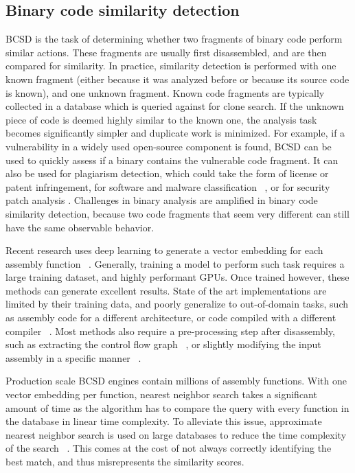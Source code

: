 \subsection{Binary code similarity detection}

BCSD is the task of determining whether two fragments of binary code perform similar actions.
These fragments are usually first disassembled, and are then compared for similarity. In practice,
similarity detection is performed with one known fragment (either because it was analyzed before
or because its source code is known), and one unknown fragment. Known code fragments are typically collected in a
database which is queried against for clone search. If the unknown piece of code is deemed
highly similar to the known one, the analysis task becomes significantly simpler and duplicate work is minimized. For example,
if a vulnerability in a widely used open-source component is found, BCSD can be used to quickly
assess if a binary contains the vulnerable code fragment. It can also be used for plagiarism detection, which
could take the form of license or patent infringement, for software and malware classification ~\cite{op-seq}, or for 
security patch analysis \cite{patch}. Challenges in binary analysis are amplified in binary code similarity detection,
because two code fragments that seem very different can still have the same observable behavior.

Recent research uses deep learning to generate a vector embedding for each assembly function ~\cite{SAFE,PalmTree,OrderMatters,Asm2Vec,CLAP}.
Generally, training a model to perform such task requires a large training dataset, and highly performant GPUs.
Once trained however, these methods can generate excellent results.
State of the art implementations are limited by their training data, and poorly generalize to out-of-domain tasks,
such as assembly code for a different architecture, or code compiled with a different compiler ~\cite{BCSDsurvey,CLAP}.
Most methods also require a pre-processing step after disassembly, such as extracting the control flow graph
~\cite{OrderMatters,Asm2Vec}, or slightly modifying the input assembly in a specific manner ~\cite{PalmTree,CLAP}.

Production scale BCSD engines contain millions of assembly functions. With one vector embedding per function, nearest neighbor
search takes a significant amount of time as the algorithm has to compare the query with every function in the database in linear
time complexity. To alleviate this issue, approximate nearest neighbor search is used on large databases to reduce the time
complexity of the search ~\cite{ANN,ANN-limits}. This comes at the cost of not always correctly identifying the best match, and thus
misrepresents the similarity scores.


